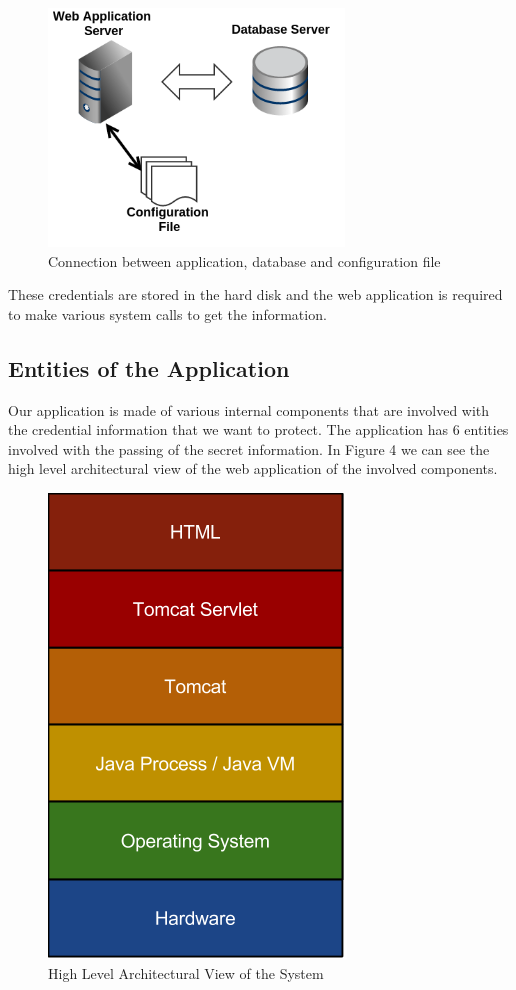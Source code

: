 \documentclass[11pt, a4paper, twoside, notitlepage]{article}
\begin{document}
\begin{figure}[h]
    \centering
    \includegraphics[width=0.7\textwidth]{config}
    \caption{Connection between application, database and configuration file}
\end{figure}

These credentials are stored in the hard disk and the web application is required to make various system calls to get the information.

\subsection*{Entities of the Application}
 Our application is made of various internal components that are involved with the credential  information that we want to protect. The application has 6 entities involved with the passing of the secret information. In Figure 4 we can see the high level architectural view of the web application of the involved components. 

\begin{figure}[h!]
    \centering
    \includegraphics[height=0.3\paperheight]{high-level-archecuture}
    \caption{High Level Architectural View of the System}
\end{figure}
\end{document}
